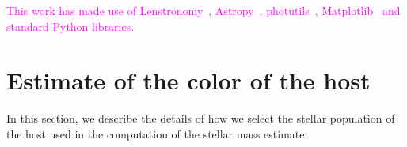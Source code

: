 \documentclass[fleqn,usenatbib]{mnras}
\newcommand{\lenstronomy}{{\sc Lenstronomy}}
\newcommand{\pink}[1]{{\textcolor{magenta}{#1}}}
\begin{document}
\pink{This work has made use of \lenstronomy~\citep{lenstronomy}, {\sc Astropy}~\citep{Astropy}, {\sc photutils}~\citep{photutils}, {\sc Matplotlib}~\citep{Matplotlib} and standard Python libraries.}









\appendix

\section{Estimate of the color of the host}
In this section, we describe the details of how we select the stellar population of the host used in the computation of the stellar mass estimate.
\end{document}
